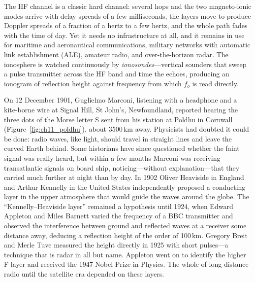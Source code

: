 The HF channel is a classic hard channel: several hops and the two magneto-ionic modes arrive
with delay spreads of a few milliseconds, the layers move to produce Doppler spreads of a
fraction of a hertz to a few hertz, and the whole path fades with the time of day. Yet it needs no
infrastructure at all, and it remains in use for maritime and aeronautical communications,
military networks with automatic link establishment (ALE), amateur radio, and
over-the-horizon radar. The ionosphere is watched continuously by \emph{ionosondes}---vertical
sounders that sweep a pulse transmitter across the HF band and time the echoes, producing an
ionogram of reflection height against frequency from which $f_o$ is read directly.


\begin{history}
On 12 December 1901, Guglielmo Marconi, listening with a headphone and a kite-borne wire at
Signal Hill, St John's, Newfoundland, reported hearing the three dots of the Morse letter S sent
from his station at Poldhu in Cornwall (Figure~\ref{fig:ch11_poldhu}), about 3500\,km away.
Physicists had doubted it could be done: radio waves, like light, should travel in straight
lines and leave the curved Earth behind. Some historians have since questioned whether the faint
signal was really heard, but within a few months Marconi was receiving transatlantic signals on
board ship, noticing---without explanation---that they carried much further at night than by day.
In 1902 Oliver Heaviside in England and Arthur Kennelly in the United States independently
proposed a conducting layer in the upper atmosphere that would guide the waves around the globe.
The ``Kennelly--Heaviside layer'' remained a hypothesis until 1924, when Edward Appleton and Miles
Barnett varied the frequency of a BBC transmitter and observed the interference between ground and
reflected waves at a receiver some distance away, deducing a reflection height of the order of
100\,km. Gregory Breit and Merle Tuve measured the height directly in 1925 with short pulses---a
technique that is radar in all but name. Appleton went on to identify the higher F layer and
received the 1947 Nobel Prize in Physics. The whole of long-distance radio until the satellite era
depended on these layers.
\end{history}


